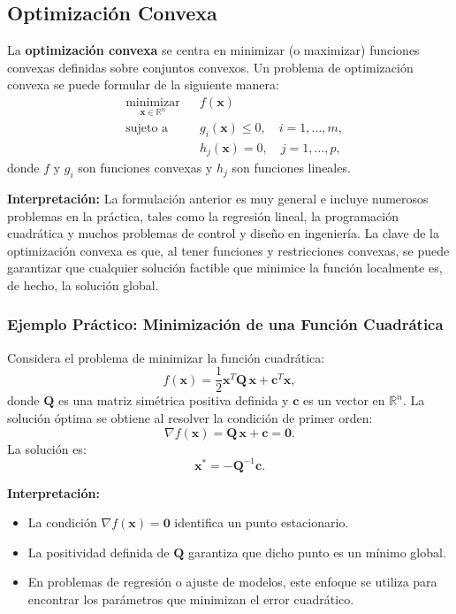 \documentclass[12pt,a4,oneside]{book}
\begin{document}
	\subsection{Optimización Convexa}
	
	La \textbf{optimización convexa} se centra en minimizar (o maximizar) funciones convexas definidas sobre conjuntos convexos. Un problema de optimización convexa se puede formular de la siguiente manera:
	\[
	\begin{aligned}
		& \underset{\mathbf{x} \in \mathbb{R}^n}{\text{minimizar}}
		& & f(\mathbf{x}) \\
		& \text{sujeto a}
		& & g_i(\mathbf{x}) \leq 0, \quad i = 1, \ldots, m, \\
		& & & h_j(\mathbf{x}) = 0, \quad j = 1, \ldots, p,
	\end{aligned}
	\]
	donde \( f \) y \( g_i \) son funciones convexas y \( h_j \) son funciones lineales.
	
	\textbf{Interpretación:}  
	La formulación anterior es muy general e incluye numerosos problemas en la práctica, tales como la regresión lineal, la programación cuadrática y muchos problemas de control y diseño en ingeniería. La clave de la optimización convexa es que, al tener funciones y restricciones convexas, se puede garantizar que cualquier solución factible que minimice la función localmente es, de hecho, la solución global.
	
	\subsubsection{Ejemplo Práctico: Minimización de una Función Cuadrática}
	
	Considera el problema de minimizar la función cuadrática:
	\[
	f(\mathbf{x}) = \frac{1}{2}\mathbf{x}^T \mathbf{Q}\, \mathbf{x} + \mathbf{c}^T \mathbf{x},
	\]
	donde \(\mathbf{Q}\) es una matriz simétrica positiva definida y \(\mathbf{c}\) es un vector en \(\mathbb{R}^n\). La solución óptima se obtiene al resolver la condición de primer orden:
	\[
	\nabla f(\mathbf{x}) = \mathbf{Q}\, \mathbf{x} + \mathbf{c} = \mathbf{0}.
	\]
	La solución es:
	\[
	\mathbf{x}^* = -\mathbf{Q}^{-1}\mathbf{c}.
	\]
	
	\textbf{Interpretación:}  
	\begin{itemize}
		\item La condición \(\nabla f(\mathbf{x}) = \mathbf{0}\) identifica un punto estacionario.
		\item La positividad definida de \(\mathbf{Q}\) garantiza que dicho punto es un mínimo global.
		\item En problemas de regresión o ajuste de modelos, este enfoque se utiliza para encontrar los parámetros que minimizan el error cuadrático.
	\end{itemize}
	
\end{document}
